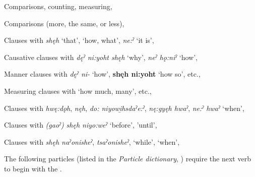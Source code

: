 \begin{CayugaRelated}
\item{}Comparisons, counting, measuring, 
\item{}Comparisons (more, the same, or less), \\
\item{}Clauses with \textit{shęh} ‘that’,  ‘how, what’, \textit{ne:ˀ} ‘it is’, \\
\item{}Causative clauses with \textit{dęˀ ni:yoht shęh} ‘why’, \textit{neˀ hǫ:niˀ} ‘how’, \\
\item{}Manner clauses with \textit{dęˀ ni-} ‘how’, \textbf{shęh ni:yoht} ‘how so’, etc., \\
\item{}Measuring clauses with  ‘how much, many’, etc., \\
\item{}Clauses with \textit{hwę:dǫh}, \textit{nęh}, \textit{do: niyowi̱hsdaˀe:ˀ}, \textit{nę:gyęh hwaˀ}, \textit{ne:ˀ hwaˀ} ‘when’,  \\
\item{}Clauses with \textit{(gaoˀ) shęh niyo:weˀ} ‘before’, 'until’, \\
\item{}Clauses with \textit{shęh naˀonisheˀ}, \textit{tsaˀonisheˀ},  ‘while’, ‘when’, \\
\end{CayugaRelated}

The following particles (listed in the \textit{Particle dictionary}, ) require the next verb to begin with the  \textsc{\partitive}.
 
